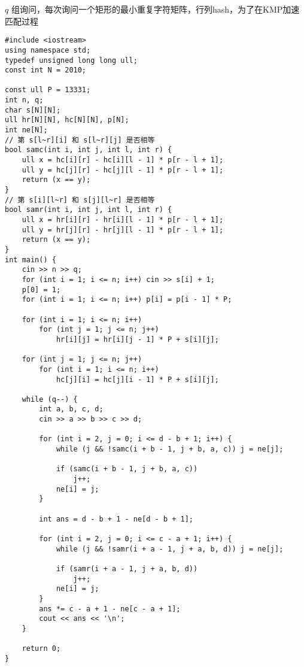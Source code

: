 \begin{tcolorbox}
\par $q$ 组询问，每次询问一个矩形的最小重复字符矩阵，行列hash，为了在KMP加速匹配过程
\end{tcolorbox}
\begin{verbatim}
#include <iostream>
using namespace std;
typedef unsigned long long ull;
const int N = 2010;

const ull P = 13331;
int n, q;
char s[N][N];
ull hr[N][N], hc[N][N], p[N];
int ne[N];
// 第 s[l~r][i] 和 s[l~r][j] 是否相等 
bool samc(int i, int j, int l, int r) {
    ull x = hc[i][r] - hc[i][l - 1] * p[r - l + 1];
    ull y = hc[j][r] - hc[j][l - 1] * p[r - l + 1];
    return (x == y);
}
// 第 s[i][l~r] 和 s[j][l~r] 是否相等 
bool samr(int i, int j, int l, int r) {
    ull x = hr[i][r] - hr[i][l - 1] * p[r - l + 1];
    ull y = hr[j][r] - hr[j][l - 1] * p[r - l + 1];
    return (x == y);
}
int main() {
    cin >> n >> q;
    for (int i = 1; i <= n; i++) cin >> s[i] + 1;
    p[0] = 1;
    for (int i = 1; i <= n; i++) p[i] = p[i - 1] * P;

    for (int i = 1; i <= n; i++)
        for (int j = 1; j <= n; j++)
            hr[i][j] = hr[i][j - 1] * P + s[i][j];

    for (int j = 1; j <= n; j++)
        for (int i = 1; i <= n; i++)
            hc[j][i] = hc[j][i - 1] * P + s[i][j];

    while (q--) {
        int a, b, c, d;
        cin >> a >> b >> c >> d;

        for (int i = 2, j = 0; i <= d - b + 1; i++) {
            while (j && !samc(i + b - 1, j + b, a, c)) j = ne[j];

            if (samc(i + b - 1, j + b, a, c))
                j++;
            ne[i] = j;
        }

        int ans = d - b + 1 - ne[d - b + 1];

        for (int i = 2, j = 0; i <= c - a + 1; i++) {
            while (j && !samr(i + a - 1, j + a, b, d)) j = ne[j];

            if (samr(i + a - 1, j + a, b, d))
                j++;
            ne[i] = j;
        }
        ans *= c - a + 1 - ne[c - a + 1];
        cout << ans << '\n';
    }

    return 0;
}
\end{verbatim}
